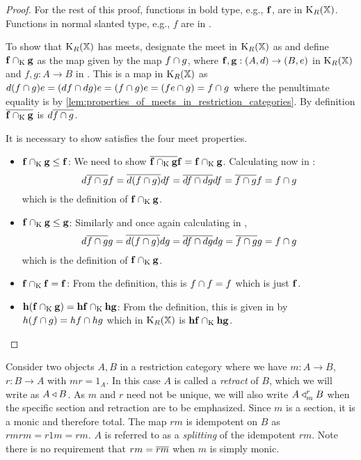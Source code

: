 \begin{proof}
  For the rest of this proof, functions in bold type, e.g., $\mathbf{f}$, are in $\text{K}_{R}(\mathbb{X})$.
  Functions in normal slanted type, e.g., $f$ are in \X.

  To show that $\text{K}_{R}(\mathbb{X})$ has meets,  designate the meet in $\text{K}_{R}(\mathbb{X})$ as \meetspl
  and define $\mathbf{f} \cap_{\text{K}} \mathbf{g}$ as the map given by the \X map $f \cap g$, where
  $\mathbf{f},\mathbf{g}:(A,d)\to(B,e)$ in $\text{K}_{R}(\mathbb{X})$ and $f,g:A\to B$ in \X . This is
  a map in $\text{K}_{R}(\mathbb{X})$ as
  $d(f \cap g)e = (d\hspace{0.1pt} f \cap d\hspace{0.1pt} g) e = (f \cap g) e = (f e \cap g) = f\cap g$
  where the penultimate equality is by
  \ref{lem:properties_of_meets_in_restriction_categories}.
  By definition $\overline{\mathbf{f} \cap_{\text{K}} \mathbf{g} }$ is $d\overline{f\cap g}$.

  It is necessary to show \meetspl satisfies the four meet properties.
  \begin{itemize}
    \item{$\mathbf{f}\cap_{\text{K}} \mathbf{g} \le \mathbf{f}$: } We need to show
      $\overline{\mathbf{f} \cap_{\text{K}} \mathbf{g}} \mathbf{f} =  \mathbf{f} \cap_{\text{K}} \mathbf{g}$.  Calculating now in \X:
      \[
        d \overline{f \cap g} f= \overline{d(f\cap g)} d f  = \overline{d f \cap d g} d f
         = \overline{f \cap g} f  = f \cap g
      \]
      which is the definition of $\mathbf{f} \cap_{\text{K}} \mathbf{g}$.
    \item{$\mathbf{f}\cap_{\text{K}} \mathbf{g} \le \mathbf{g}$: } Similarly and once again calculating in \X,
      \[
        d \overline{f \cap g} g = \overline{d(f\cap g)} d g  = \overline{d f \cap d g} d g
         = \overline{f \cap g} g  = f \cap g
      \]
      which is the definition of $\mathbf{f} \cap_{\text{K}} \mathbf{g}$.
    \item{$\mathbf{f}\cap_{\text{K}} \mathbf{f} = \mathbf{f}$: } From the definition, this is $f \cap f = f$ which
      is just $ \mathbf{f}$.
    \item{$\mathbf{h}(\mathbf{f}\cap_{\text{K}} \mathbf{g}) = \mathbf{h}\mathbf{f} \cap_{\text{K}} \mathbf{h}\mathbf{g}$: }
      From the definition, this is given in \X by $ h (f \cap g) =
      h f \cap h g$ which in $\text{K}_{R}(\mathbb{X})$ is $\mathbf{h}\mathbf{f} \cap_{\text{K}} \mathbf{h}\mathbf{g}$.
  \end{itemize}
\end{proof}

Consider two objects $A, B$
in a restriction category where we have $m: A\to B$, $r:B \to A$ with $m r = 1_A$. In this case
$A$ is called a \emph{retract} of $B$, which we will write as $A\triangleleft B$. As $m$ and $r$ need
not be unique, we will also write $A \triangleleft_{m}^{r} B$ when the specific section and retraction
are to be emphasized. Since $m$ is a section, it is a monic and therefore total. The map $r m$ is
idempotent on $B$ as $r m r m = r 1 m = r m$. $A$ is referred to as a \emph{splitting} of the
idempotent $r m$. Note there is no requirement that $r m = \overline{r m}$ when $m$ is simply monic.

